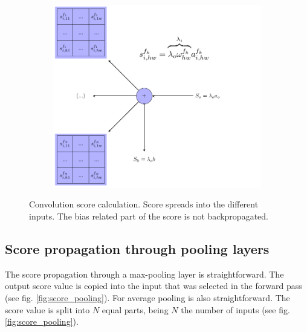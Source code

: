 \documentclass[preprint]{elsarticle}
\theoremstyle{definition} %
\theoremstyle{remark}
\begin{document}
\begin{figure}[h!]
\begin{subfigure}{0.4\textwidth}
		\includegraphics[scale=0.4]{figures/score_conv2d-score.pdf}
	\end{subfigure}
	\caption{Convolution score calculation. Score spreads into the different inputs. The bias related part of the score is not backpropagated.}
	\label{fig:convolution_score}
\end{figure}

\subsection{Score propagation through pooling layers}

The score propagation through a max-pooling layer is straightforward. The output score value is copied into the input that was selected in the forward pass (see fig. \ref{fig:score_pooling}). For average pooling is also straightforward. The score value is split into $N$ equal parts, being $N$ the number of inputs (see fig. \ref{fig:score_pooling}).
\end{document}
